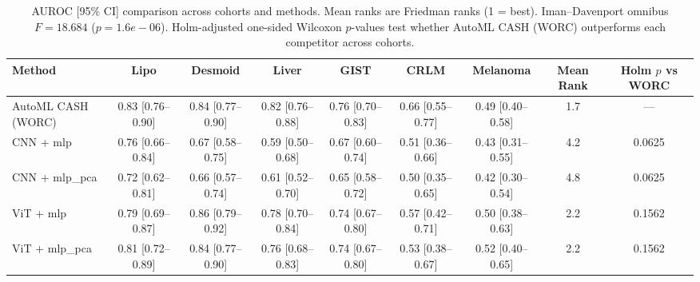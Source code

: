 \begin{table}[t]
\centering
\small
\setlength{\tabcolsep}{4pt}
\caption{AUROC [95\% CI] comparison across cohorts and methods. Mean ranks are Friedman ranks (1 = best). Iman--Davenport omnibus $F=18.684$ ($p=1.6e-06$). Holm-adjusted one-sided Wilcoxon $p$-values test whether AutoML CASH (WORC) outperforms each competitor across cohorts.}
\label{tab:all_methods_benchmark}
\begin{tabular*}{\textwidth}{@{\extracolsep{\fill}}l cccccc cc@{}}
\toprule
\textbf{Method} & \textbf{Lipo} & \textbf{Desmoid} & \textbf{Liver} & \textbf{GIST} & \textbf{CRLM} & \textbf{Melanoma} & \textbf{Mean Rank} & \textbf{Holm $p$ vs WORC} \\
\midrule
AutoML CASH (WORC) & 0.83 [0.76--0.90] & 0.84 [0.77--0.90] & 0.82 [0.76--0.88] & 0.76 [0.70--0.83] & 0.66 [0.55--0.77] & 0.49 [0.40--0.58] & 1.7 & --- \\
CNN + mlp & 0.76 [0.66--0.84] & 0.67 [0.58--0.75] & 0.59 [0.50--0.68] & 0.67 [0.60--0.74] & 0.51 [0.36--0.66] & 0.43 [0.31--0.55] & 4.2 & 0.0625 \\
CNN + mlp_pca & 0.72 [0.62--0.81] & 0.66 [0.57--0.74] & 0.61 [0.52--0.70] & 0.65 [0.58--0.72] & 0.50 [0.35--0.65] & 0.42 [0.30--0.54] & 4.8 & 0.0625 \\
ViT + mlp & 0.79 [0.69--0.87] & 0.86 [0.79--0.92] & 0.78 [0.70--0.84] & 0.74 [0.67--0.80] & 0.57 [0.42--0.71] & 0.50 [0.38--0.63] & 2.2 & 0.1562 \\
ViT + mlp_pca & 0.81 [0.72--0.89] & 0.84 [0.77--0.90] & 0.76 [0.68--0.83] & 0.74 [0.67--0.80] & 0.53 [0.38--0.67] & 0.52 [0.40--0.65] & 2.2 & 0.1562 \\
\bottomrule
\end{tabular*}
\end{table}